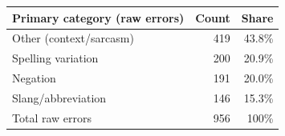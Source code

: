 \begin{tabular}{lrr}
\toprule
Primary category (raw errors) & Count & Share\\
\midrule
Other (context/sarcasm) & 419 & 43.8\%\\
Spelling variation & 200 & 20.9\%\\
Negation & 191 & 20.0\%\\
Slang/abbreviation & 146 & 15.3\%\\
\midrule
Total raw errors & 956 & 100\%\\
\bottomrule
\end{tabular}
